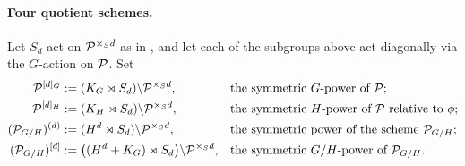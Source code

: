 \documentclass[11pt]{article}
\begin{document}
\paragraph{Four quotient schemes.}
Let $S_d$ act on $\mathcal{P}^{\times_S d}$ as in , and let
each of the subgroups above act diagonally via the $G$-action on $\mathcal{P}$.  Set
\[
\begin{aligned}
    \mathcal{P}^{[d]_G}        &:= (K_{G} \rtimes S_d)\backslash \mathcal{P}^{\times_S d},
        &&\text{the symmetric $G$-power of $\mathcal{P}$;}\\
    \mathcal{P}^{[d]_H}        &:= (K_H \rtimes S_d)\backslash \mathcal{P}^{\times_S d},
        &&\text{the symmetric $H$-power of $\mathcal{P}$ relative to $\phi$;}\\
    (\mathcal{P}_{G/H})^{(d)}  &:= (H^d \rtimes S_d)\backslash \mathcal{P}^{\times_S d},
        &&\text{the symmetric power of the scheme $\mathcal{P}_{G/H}$;}\\
    (\mathcal{P}_{G/H})^{[d]}  &:= \bigl((H^d + K_{G})\rtimes S_d\bigr)\backslash \mathcal{P}^{\times_S d},
        &&\text{the symmetric $G/H$-power of $\mathcal{P}_{G/H}$.}
\end{aligned}
\]
\end{document}
